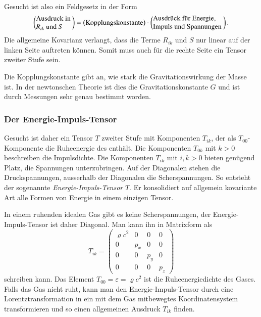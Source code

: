 Gesucht ist also ein Feldgesetz in der Form
\begin{equation}
\left(
\begin{minipage}{1.8cm}
\raggedright
Ausdruck in $R_{ik}$ und $S$
\end{minipage}
\right)
=
\left(
\text{Kopplungskonstante}
\right)
\cdot
\left(
\begin{minipage}{3.5cm}
\raggedright
Ausdrück für Energie, Impuls und Spannungen
\end{minipage}
\right).
\label{buch:kruemmung:feldgleichungen:eqn:schema}
\end{equation}
Die allgemeine Kovarianz verlangt, dass die Terme $R_{ik}$ und $S$
nur linear auf der linken Seite auftreten können.
Somit muss auch für die rechte Seite ein Tensor zweiter Stufe sein.

Die Kopplungskonstante gibt an, wie stark die Gravitationswirkung
der Masse ist. 
In der newtonschen Theorie ist dies die Gravitationskonstante $G$
und ist durch Messungen sehr genau bestimmt worden.

%
%
\subsubsection{Der Energie-Impuls-Tensor}
Gesucht ist daher ein Tensor $T$ zweiter Stufe mit Komponenten
$T_{ik}$, der als $T_{00}$-Kompo\-nen\-te die Ruheenergie des enthält.
Die Komponenten $T_{0k}$ mit $k>0$ beschreiben die Impulsdichte.
Die Komponenten $T_{ik}$ mit $i,k>0$ bieten genügend Platz, die
Spannungen unterzubringen.
Auf der Diagonalen stehen die Druckspannungen, ausserhalb der Diagonalen
die Scherspannungen.
So entsteht der sogenannte \emph{Energie-Impuls-Tensor} $T$.
Er konsolidiert auf allgemein kovariante Art alle Formen von Energie
in einem einzigen Tensor.

In einem ruhenden idealen Gas gibt es keine Scherspannungen,
der Energie-Impuls-Tensor ist daher Diagonal.
Man kann ihn in Matrixform als
\begin{equation}
T_{ik}
=
\begin{pmatrix}
\varrho     c^2 & 0             & 0             & 0             \\
0               & p_x           & 0             & 0             \\
0               & 0             & p_y           & 0             \\
0               & 0             & 0             & p_z
\end{pmatrix}
\label{buch:kruemmung:feldgleichung:eqn:Tik}
\end{equation}
schreiben kann.
Das Element $T_{00} = \varepsilon = \varrho c^2$ ist die
Ruheenergiedichte des Gases.
Falls das Gas nicht ruht, kann man den Energie-Impuls-Tensor durch
eine Lorentztransformation in ein mit dem Gas mitbewegtes 
Koordinatensystem transformieren und so einen allgemeinen Ausdruck
$T_{ik}$ finden.

